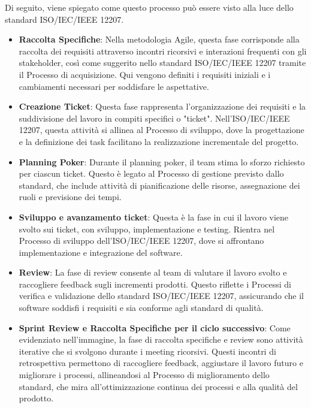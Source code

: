 Di seguito, viene spiegato come questo processo può essere visto alla luce dello standard ISO/IEC/IEEE 12207.
\begin{itemize}
    \item \textbf{Raccolta Specifiche}: Nella metodologia Agile, questa fase corrisponde alla raccolta dei requisiti attraverso incontri ricorsivi e interazioni frequenti con gli stakeholder, così come suggerito nello standard ISO/IEC/IEEE 12207 tramite il Processo di acquisizione. Qui vengono definiti i requisiti iniziali e i cambiamenti necessari per soddisfare le aspettative.
    \item \textbf{Creazione Ticket}: Questa fase rappresenta l'organizzazione dei requisiti e la suddivisione del lavoro in compiti specifici o "ticket". Nell'ISO/IEC/IEEE 12207, questa attività si allinea al Processo di sviluppo, dove la progettazione e la definizione dei task facilitano la realizzazione incrementale del progetto.
    \item \textbf{Planning Poker}: Durante il planning poker, il team stima lo sforzo richiesto per ciascun ticket. Questo è legato al Processo di gestione previsto dallo standard, che include attività di pianificazione delle risorse, assegnazione dei ruoli e previsione dei tempi.
    \item \textbf{Sviluppo e avanzamento ticket}: Questa è la fase in cui il lavoro viene svolto sui ticket, con sviluppo, implementazione e testing. Rientra nel Processo di sviluppo dell'ISO/IEC/IEEE 12207, dove si affrontano implementazione e integrazione del software.
    \item \textbf{Review}: La fase di review consente al team di valutare il lavoro svolto e raccogliere feedback sugli incrementi prodotti. Questo riflette i Processi di verifica e validazione dello standard ISO/IEC/IEEE 12207, assicurando che il software soddisfi i requisiti e sia conforme agli standard di qualità.
    \item \textbf{Sprint Review e Raccolta Specifiche per il ciclo successivo}: Come evidenziato nell'immagine, la fase di raccolta specifiche e review sono attività iterative che si svolgono durante i meeting ricorsivi. Questi incontri di retrospettiva permettono di raccogliere feedback, aggiustare il lavoro futuro e migliorare i processi, allineandosi al Processo di miglioramento dello standard, che mira all'ottimizzazione continua dei processi e alla qualità del prodotto.
\end{itemize}

    
   
    






